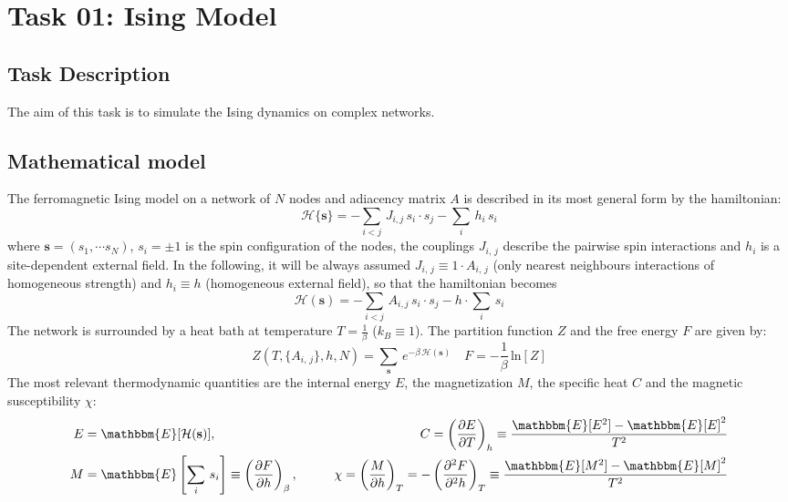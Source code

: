 \chapter{Task 01: Ising Model}
\section{Task Description}
The aim of this task is to simulate the Ising dynamics on complex networks.
\section{Mathematical model}
The ferromagnetic Ising model on a network of $N$ nodes and adiacency matrix $A$ is described in its most general form by the hamiltonian:
\begin{equation*}
    \mathcal{H}\{\mathbf{s}\} = - \sum_{i < j}\, J_{i,j}\,s_i\cdot s_j - \sum_{i}\, h_i\,s_i
\end{equation*}
where $\mathbf{s} = (s_1, \cdots s_N)$, $s_i = \pm 1$ is the spin configuration of the nodes, the couplings $J_{i,\,j}$ describe the pairwise spin interactions and $h_i$ is a site-dependent external field.
In the following, it will be always assumed $J_{i,\,j} \equiv 1\cdot A_{i,\,j}$ (only nearest neighbours interactions of homogeneous strength) and $h_i \equiv h$ (homogeneous external field), so that the hamiltonian becomes
\begin{equation}
        \mathcal{H}(\mathbf{s}) = - \sum_{i < j}\, A_{i,j}\,s_i\cdot s_j - h\cdot \sum_{i}\,s_i
\end{equation}
The network is surrounded by a heat bath at temperature $T = \frac{1}{\beta} $ ($k_B \equiv 1$). The partition function $Z$ and the free energy $F$ are given by:
\begin{equation*}
    Z\left(T, \{A_{i,\,j}\}, h, N\right) = \sum_{\mathbf{s}}\, e^{-\beta\, \mathcal{H}(\mathbf{s})} \quad F = -\frac{1}{\beta}\, \text{ln}[Z]
\end{equation*}
The most relevant thermodynamic quantities are the internal energy $E$, the magnetization $M$, the specific heat $C$ and the magnetic susceptibility $\chi$:
\begin{align*}
E &= \mathbbm{E}[\mathcal{H}(\mathbf{s})],  &C= \left( \frac{\partial E}{\partial T} \right)_{h}  \equiv \frac{\mathbbm{E}[E^2] - \mathbbm{E}[E]^2}{T^2}\\
M &= \mathbbm{E}\left[\sum_{i}\,s_i\right] \equiv \left( \frac{\partial F}{\partial h} \right)_{\beta}, \qquad 
&\chi  = \left( \frac{M}{\partial h} \right)_{T} = -\left( \frac{\partial^2 F}{\partial^2 h} \right)_{T} \equiv \frac{\mathbbm{E}[M^2] - \mathbbm{E}[M]^2}{T^2}\\
\end{align*}
